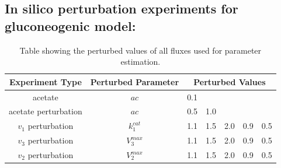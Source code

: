 \documentclass[10pt]{article}
\begin{document}
\subsection*{In silico perturbation experiments for gluconeogenic model:}
\begin{table}[!tbhp]
	\caption{Table showing the perturbed values of all fluxes used for parameter estimation.}
	\begin{center}				
		\begin{tabular}{ccccccc}
			\hline
			Experiment Type & Perturbed Parameter & \multicolumn{5}{c}{Perturbed Values}\\
			\hline
			acetate & $ac$ & \multicolumn{5}{l}{0.1}\\
			\hline
			acetate perturbation & $ac$ & 0.5 & 1.0 & & &\\
			\hline
			$v_1$ perturbation & $k_1^{cat}$ & 1.1 & 1.5 & 2.0 & 0.9 & 0.5\\
			\hline
			$v_3$ perturbation & $V_3^{max}$ & 1.1 & 1.5 & 2.0 & 0.9 & 0.5\\
			\hline
			$v_2$ perturbation & $V_2^{max}$ & 1.1 & 1.5 & 2.0 & 0.9 & 0.5\\
		\end{tabular}
	\end{center}	
	\label{tab:pval}
\end{table}



\printbibliography
\end{document}
